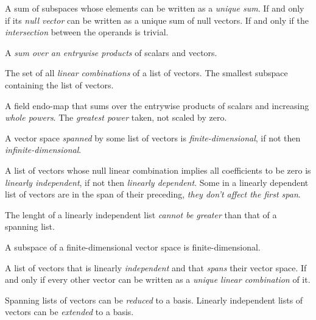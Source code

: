 \begin{multicols}{3}
  A sum of subspaces whose elements can be written as a \textit{unique sum}.
  If and only if its \textit{null vector} can be written as a unique sum of null vectors.
  If and only if the \textit{intersection} between the operands is trivial.

  A \textit{sum over an entrywise products} of scalars and vectors.
  
  The set of all \textit{linear combinations} of a list of vectors.
  The smallest subspace containing the list of vectors.

  A field endo-map that sums over the entrywise products of scalars and increasing \textit{whole powers}.
  The \textit{greatest power} taken, not scaled by zero.
  
  A vector space \textit{spanned} by some list of vectors is \textit{finite-dimensional}, if not then \textit{infinite-dimensional}.
  
  A list of vectors whose null linear combination implies all coefficients to be zero is \textit{linearly independent},
  if not then \textit{linearly dependent}.
  Some in a linearly dependent list of vectors are in the span of their preceding, \textit{they don't affect the first span}.
  
  The lenght of a linearly independent list \textit{cannot be greater} than that of a spanning list.
  
  A subspace of a finite-dimensional vector space is finite-dimensional.
  
  A list of vectors that is linearly \textit{independent} and that \textit{spans} their vector space.
  If and only if every other vector can be written as a \textit{unique linear combination} of it.
  
  Spanning lists of vectors can be \textit{reduced} to a basis.
  Linearly independent lists of vectors can be \textit{extended} to a basis.


\end{multicols}

